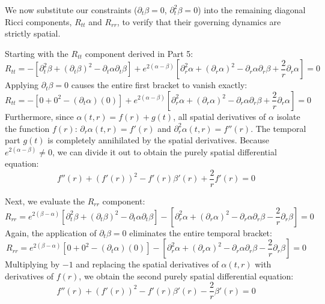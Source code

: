 \documentclass[11pt, a4paper]{report}
\begin{document}
We now substitute our constraints ($\partial_t \beta = 0$, $\partial_t^2 \beta = 0$) into the remaining diagonal Ricci components, $R_{tt}$ and $R_{rr}$, to verify that their governing dynamics are strictly spatial. 

Starting with the $R_{tt}$ component derived in Part 5:
\begin{equation}
    R_{tt} = - \left[ \partial_t^2 \beta + (\partial_t \beta)^2 - \partial_t \alpha \partial_t \beta \right] + e^{2(\alpha - \beta)} \left[ \partial_r^2 \alpha + (\partial_r \alpha)^2 - \partial_r \alpha \partial_r \beta + \frac{2}{r} \partial_r \alpha \right] = 0
\end{equation}
Applying $\partial_t \beta = 0$ causes the entire first bracket to vanish exactly:
\begin{equation}
    R_{tt} = - \left[ 0 + 0^2 - (\partial_t \alpha)(0) \right] + e^{2(\alpha - \beta)} \left[ \partial_r^2 \alpha + (\partial_r \alpha)^2 - \partial_r \alpha \partial_r \beta + \frac{2}{r} \partial_r \alpha \right] = 0
\end{equation}
Furthermore, since $\alpha(t,r) = f(r) + g(t)$, all spatial derivatives of $\alpha$ isolate the function $f(r)$: $\partial_r \alpha(t,r) = f'(r)$ and $\partial_r^2 \alpha(t,r) = f''(r)$. The temporal part $g(t)$ is completely annihilated by the spatial derivatives. Because $e^{2(\alpha - \beta)} \neq 0$, we can divide it out to obtain the purely spatial differential equation:
\begin{equation}
    f''(r) + (f'(r))^2 - f'(r) \beta'(r) + \frac{2}{r} f'(r) = 0 \label{eq:reduced_Rtt}
\end{equation}

Next, we evaluate the $R_{rr}$ component:
\begin{equation}
    R_{rr} = e^{2(\beta - \alpha)} \left[ \partial_t^2 \beta + (\partial_t \beta)^2 - \partial_t \alpha \partial_t \beta \right] - \left[ \partial_r^2 \alpha + (\partial_r \alpha)^2 - \partial_r \alpha \partial_r \beta - \frac{2}{r} \partial_r \beta \right] = 0
\end{equation}
Again, the application of $\partial_t \beta = 0$ eliminates the entire temporal bracket:
\begin{equation}
    R_{rr} = e^{2(\beta - \alpha)} \left[ 0 + 0^2 - (\partial_t \alpha)(0) \right] - \left[ \partial_r^2 \alpha + (\partial_r \alpha)^2 - \partial_r \alpha \partial_r \beta - \frac{2}{r} \partial_r \beta \right] = 0
\end{equation}
Multiplying by $-1$ and replacing the spatial derivatives of $\alpha(t,r)$ with derivatives of $f(r)$, we obtain the second purely spatial differential equation:
\begin{equation}
    f''(r) + (f'(r))^2 - f'(r) \beta'(r) - \frac{2}{r} \beta'(r) = 0 \label{eq:reduced_Rrr}
\end{equation}
\end{document}
